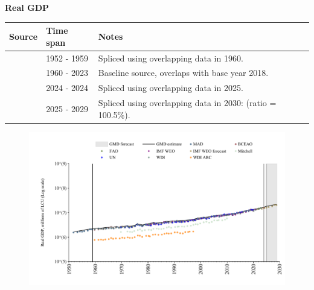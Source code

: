 \documentclass[12pt,a4paper,landscape]{article}
\begin{document}
\begin{adjustbox}{max totalsize={\paperwidth}{\paperheight},center}
\begin{minipage}[t][\textheight][t]{\textwidth}
\vspace*{0.5cm}
{}
\begin{center}
{\Large\bfseries Real GDP}
\end{center}
\vspace{0.5cm}
\begin{table}[H]
\centering
\small
\begin{tabular}{|l|l|l|}
\hline
\textbf{Source} & \textbf{Time span} & \textbf{Notes} \\
\hline
\rowcolor{white}\cite{MAD}& 1952 - 1959 &Spliced using overlapping data in 1960. \\
\rowcolor{lightgray}\cite{WDI}& 1960 - 2023 &Baseline source, overlaps with base year 2018. \\
\rowcolor{white}\cite{BCEAO}& 2024 - 2024 &Spliced using overlapping data in 2025. \\
\rowcolor{lightgray}\cite{IMF_WEO_forecast}& 2025 - 2029 &Spliced using overlapping data in 2030: (ratio = 100.5\%). \\
\hline
\end{tabular}
\end{table}
\begin{figure}[H]
\centering
\includegraphics[width=\textwidth,height=0.6\textheight,keepaspectratio]{graphs/SEN_rGDP.pdf}
\end{figure}
\end{minipage}
\end{adjustbox}
\end{document}
